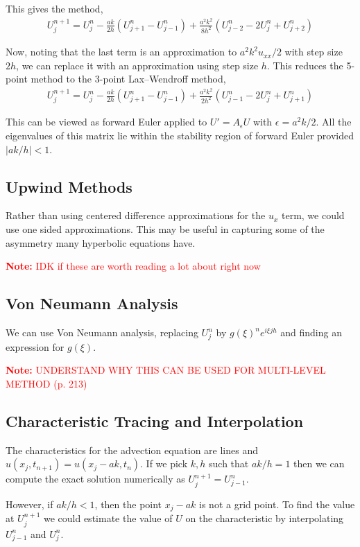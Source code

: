 \documentclass[12pt]{article}
\newcommand{\note}[1]{\textcolor{red}{\textbf{Note:} #1}}
\begin{document}
This gives the method,
\begin{align*}
    U_j^{n+1} = U_j^n - \frac{ak}{2h}(U_{j+1}^n - U_{j-1}^n) + \frac{a^2k^2}{8h^2} (U_{j-2}^n - 2U_j^n+U_{j+2}^n)
\end{align*}

Now, noting that the last term is an approximation to \( a^2k^2u_{xx}/2 \) with step size \( 2h \), we can replace it with an approximation using step size \( h \). This reduces the 5-point method to the 3-point Lax--Wendroff method,
\begin{align*}
    U_j^{n+1} = U_j^n - \frac{ak}{2h}(U_{j+1}^n - U_{j-1}^n) + \frac{a^2k^2}{2h^2} (U_{j-1}^n - 2U_j^n+U_{j+1}^n)
\end{align*}

This can be viewed as forward Euler applied to \( U' = A_\epsilon U \) with \( \epsilon = a^2k/2 \). All the eigenvalues of this matrix lie within the stability region of forward Euler provided \( |ak/h|<1 \).


\subsection{Upwind Methods}
Rather than using centered difference approximations for the \( u_x \) term, we could use one sided approximations. This may be useful in capturing some of the asymmetry many hyperbolic equations have.

\note{IDK if these are worth reading a lot about right now}

\subsection{Von Neumann Analysis}
We can use Von Neumann analysis, replacing \( U_j^n \) by \( g(\xi)^n e^{i\xi j h} \) and finding an expression for \( g(\xi) \).

\note{UNDERSTAND WHY THIS CAN BE USED FOR MULTI-LEVEL METHOD (p. 213)}

\subsection{Characteristic Tracing and Interpolation}
The characteristics for the advection equation are lines and \( u(x_j,t_{n+1}) = u(x_j-ak,t_n) \). If we pick \( k,h \) such that \( ak/h = 1 \) then we can compute the exact solution numerically as \( U_j^{n+1} = U_{j-1}^n \).

However, if \( ak/h<1 \), then the point \( x_j - ak \) is not a grid point. To find the value at \( U_j^{n+1} \) we could estimate the value of \( U \) on the characteristic by interpolating \( U_{j-1}^n \) and \( U_j^n \).
\end{document}
